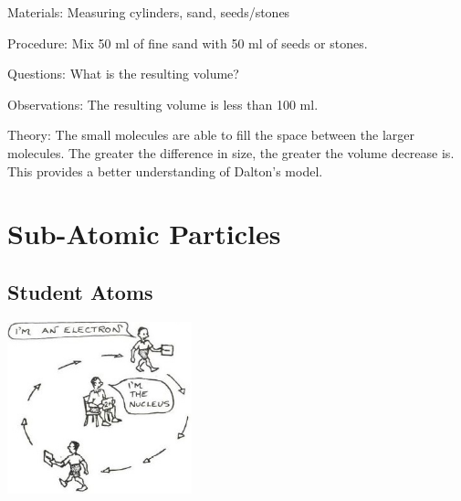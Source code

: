 \begin{multicols}{2}
\begin{description*}
\item[Materials:]{Measuring cylinders, sand, seeds/stones}
\item[Procedure:]{Mix 50 ml of fine sand with 50 ml of seeds
or stones.}
\item[Questions:]{What is the resulting volume?}
\item[Observations:]{The resulting volume is less than 100 ml.}
\item[Theory:]{The small molecules are able to fill the space
between the larger molecules. The greater the
difference in size, the greater the volume decrease
is. This provides a better understanding of
Dalton's model.}
\end{description*}


\section*{Sub-Atomic Particles} 


\subsection{Student Atoms}

\begin{center}
\includegraphics[width=0.4\textwidth]{./img/source/student-atom.jpg}
\end{center}


\end{multicols}
